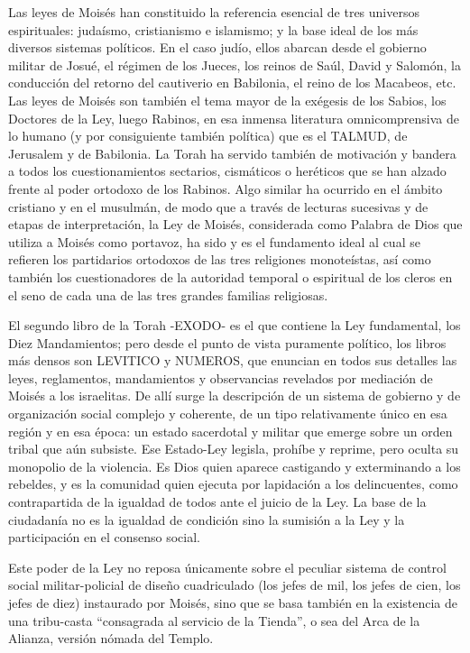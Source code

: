 \documentclass[
]{book}
\begin{document}
Las leyes de Moisés han constituido la referencia esencial de tres universos espirituales: judaísmo, cristianismo e islamismo; y la base ideal de los más diversos sistemas políticos. En el caso judío, ellos abarcan desde el gobierno militar de Josué, el régimen de los Jueces, los reinos de Saúl, David y Salomón, la conducción del retorno del cautiverio en Babilonia, el reino de los Macabeos, etc. Las leyes de Moisés son también el tema mayor de la exégesis de los Sabios, los Doctores de la Ley, luego Rabinos, en esa inmensa literatura omnicomprensiva de lo humano (y por consiguiente también política) que es el TALMUD, de Jerusalem y de Babilonia. La Torah ha servido también de motivación y bandera a todos los cuestionamientos sectarios, cismáticos o heréticos que se han alzado frente al poder ortodoxo de los Rabinos. Algo similar ha ocurrido en el ámbito cristiano y en el musulmán, de modo que a través de lecturas sucesivas y de etapas de interpretación, la Ley de Moisés, considerada como Palabra de Dios que utiliza a Moisés como portavoz, ha sido y es el fundamento ideal al cual se refieren los partidarios ortodoxos de las tres religiones monoteístas, así como también los cuestionadores de la autoridad temporal o espiritual de los cleros en el seno de cada una de las tres grandes familias religiosas.

El segundo libro de la Torah -EXODO- es el que contiene la Ley fundamental, los Diez Mandamientos; pero desde el punto de vista puramente político, los libros más densos son LEVITICO y NUMEROS, que enuncian en todos sus detalles las leyes, reglamentos, mandamientos y observancias revelados por mediación de Moisés a los israelitas. De allí surge la descripción de un sistema de gobierno y de organización social complejo y coherente, de un tipo relativamente único en esa región y en esa época: un estado sacerdotal y militar que emerge sobre un orden tribal que aún subsiste. Ese Estado-Ley legisla, prohíbe y reprime, pero oculta su monopolio de la violencia. Es Dios quien aparece castigando y exterminando a los rebeldes, y es la comunidad quien ejecuta por lapidación a los delincuentes, como contrapartida de la igualdad de todos ante el juicio de la Ley. La base de la ciudadanía no es la igualdad de condición sino la sumisión a la Ley y la participación en el consenso social.

Este poder de la Ley no reposa únicamente sobre el peculiar sistema de control social militar-policial de diseño cuadriculado (los jefes de mil, los jefes de cien, los jefes de diez) instaurado por Moisés, sino que se basa también en la existencia de una tribu-casta ``consagrada al servicio de la Tienda'', o sea del Arca de la Alianza, versión nómada del Templo.
\end{document}
